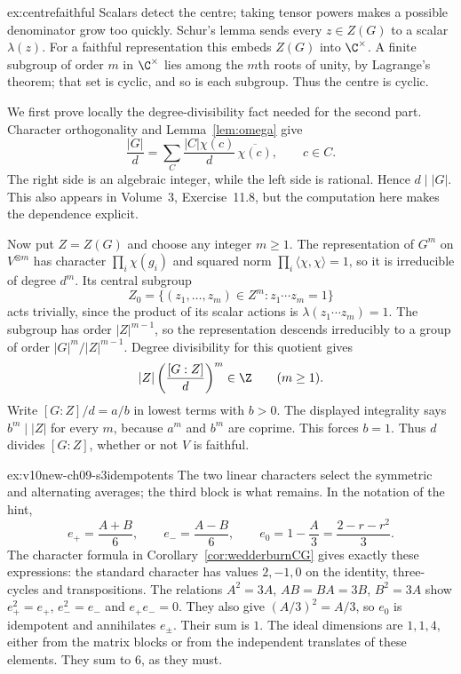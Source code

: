 \begin{solution}{ex:centrefaithful}
\idea Scalars detect the centre; taking tensor powers makes a possible denominator grow too quickly.
\writeup Schur's lemma sends every $z\in Z(G)$ to a scalar $\lambda(z)$. For a faithful representation this embeds $Z(G)$ into $\C^\times$. A finite subgroup of order $m$ in $\C^\times$ lies among the $m$th roots of unity, by Lagrange's theorem; that set is cyclic, and so is each subgroup. Thus the centre is cyclic.

We first prove locally the degree-divisibility fact needed for the second part. Character orthogonality and Lemma~\ref{lem:omega} give
\[
\frac{|G|}{d}
=\sum_C\frac{|C|\chi(c)}{d}\,\overline{\chi(c)},
\qquad c\in C.
\]
The right side is an algebraic integer, while the left side is rational. Hence $d\mid|G|$. This also appears in Volume~3, Exercise~11.8, but the computation here makes the dependence explicit.

Now put $Z=Z(G)$ and choose any integer $m\ge1$. The representation of $G^m$ on $V^{\otimes m}$ has character $\prod_i\chi(g_i)$ and squared norm $\prod_i\langle\chi,\chi\rangle=1$, so it is irreducible of degree $d^m$. Its central subgroup
\[
Z_0=\{(z_1,\ldots,z_m)\in Z^m:z_1\cdots z_m=1\}
\]
acts trivially, since the product of its scalar actions is $\lambda(z_1\cdots z_m)=1$. The subgroup has order $|Z|^{m-1}$, so the representation descends irreducibly to a group of order $|G|^m/|Z|^{m-1}$. Degree divisibility for this quotient gives
\[
|Z|\left(\frac{[G:Z]}d\right)^m\in\Z
\qquad(m\ge1).
\]
Write $[G:Z]/d=a/b$ in lowest terms with $b>0$. The displayed integrality says $b^m\mid|Z|$ for every $m$, because $a^m$ and $b^m$ are coprime. This forces $b=1$. Thus $d$ divides $[G:Z]$, whether or not $V$ is faithful.
\end{solution}

\begin{solution}{ex:v10new-ch09-s3idempotents}
\idea The two linear characters select the symmetric and alternating averages; the third block is what remains.
\writeup In the notation of the hint,
\[
e_+=\frac{A+B}{6},\qquad e_-=\frac{A-B}{6},
\qquad e_0=1-\frac A3=\frac{2-r-r^2}{3}.
\]
The character formula in Corollary~\ref{cor:wedderburnCG} gives exactly these expressions: the standard character has values $2,-1,0$ on the identity, three-cycles and transpositions. The relations $A^2=3A$, $AB=BA=3B$, $B^2=3A$ show $e_+^2=e_+$, $e_-^2=e_-$ and $e_+e_-=0$. They also give $(A/3)^2=A/3$, so $e_0$ is idempotent and annihilates $e_\pm$. Their sum is $1$. The ideal dimensions are $1,1,4$, either from the matrix blocks or from the independent translates of these elements. They sum to $6$, as they must.
\end{solution}

